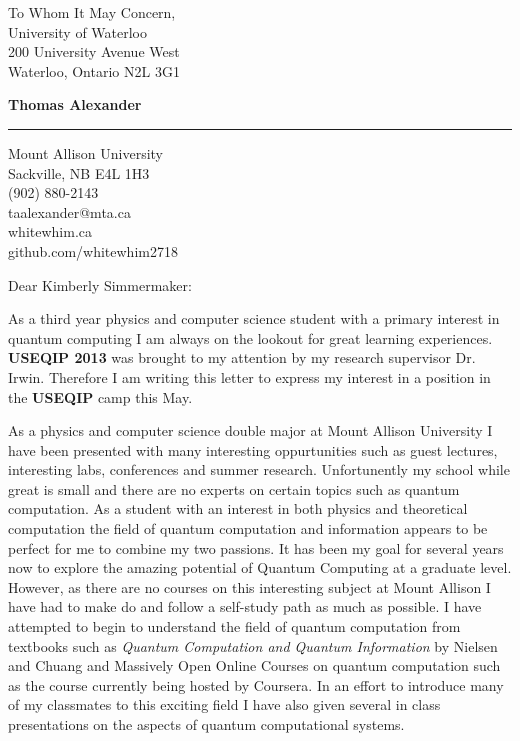 \documentclass{letter} %
\begin{document}
\signature{Thomas Alexander}           %
\longindentation=0pt                       %
\let\raggedleft\raggedright                %
 
 
\begin{letter}{To Whom It May Concern, \\

 University of Waterloo\\
 200 University Avenue West \\
 Waterloo, Ontario  N2L 3G1}

\begin{center}
{\large\bf Thomas Alexander} 
\end{center}
\medskip\hrule height 1pt
\begin{center}
{Mount Allison University \\   Sackville, NB E4L 1H3 \\ (902) 880-2143 \\ taalexander@mta.ca\\ whitewhim.ca \\ github.com/whitewhim2718}
\end{center} %
 
 
\opening{Dear Kimberly Simmermaker:} 
 
\noindent As a third year physics and computer science student with a primary interest in
quantum computing I am always on the lookout for great learning experiences. \textbf {USEQIP 2013} was brought to my attention by my research supervisor Dr. Irwin. Therefore I am writing this letter to express my interest in a position in the \textbf{USEQIP} camp this May.
 
\noindent As a physics and computer science double major at Mount Allison University I have been presented with many interesting oppurtunities such as guest lectures, interesting labs, conferences and summer research. Unfortunently my school while great is small and there are no experts on certain topics such as quantum computation. As a student with an interest in both physics and theoretical computation the field of quantum computation and information appears to be perfect for me to combine my two passions. It has been my goal for several years now to explore the amazing potential of Quantum Computing at a graduate level. However, as there are no courses on this interesting subject at Mount Allison I have had to make do and follow a self-study path as much as possible. I have attempted to begin to understand the field of quantum computation from textbooks such as \emph{Quantum Computation and Quantum Information} by Nielsen and Chuang and Massively Open Online Courses on quantum computation such as the course currently being hosted by Coursera. In an effort to introduce many of my classmates to this exciting field I have also given several in class presentations on the aspects of quantum computational systems. 


\end{letter}
\end{document}
